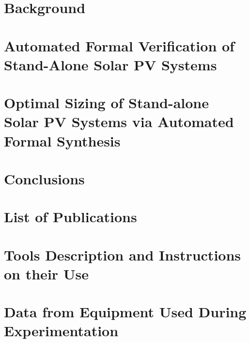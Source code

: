 \documentclass[12pt,twoside]{report}
\begin{document}
\chapter{Background}
\label{chap:background}


%
%
%

\chapter{Automated Formal Verification of Stand-Alone Solar PV Systems}
\label{chap:automatedverification}


\chapter{Optimal Sizing of Stand-alone Solar PV Systems via Automated Formal Synthesis}
\label{chap:automatedsynthesis}


\chapter{Conclusions}
\label{chap:conclusions}


\appendix
\chapter{List of Publications}
\label{chap:publications}


\chapter{Tools Description and Instructions on their Use}
\label{chap:tools}


\chapter{Data from Equipment Used During Experimentation}
\label{chap:data}
\fancyfoot{}

\fancyfoot{}

\renewcommand\bibname{References}

{}
\end{document}
